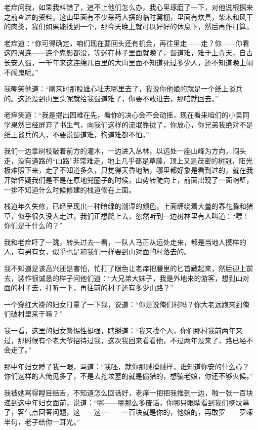 老痒问我，如果我料错了，追不上他们怎么办，我心里琢磨了一下，对他说根据来之前查过的资料，这山里面有不少采药人搭的临时窝棚，里面有炊具，柴木和风干的肉类，我们如果能找到一个，那今天晚上就可以好好的休息下，然后再作打算。

老痒道：“你可得确定，咱们现在要回头还有机会，再往里走——走？你——你看这四周连——连个鬼影都没，等迷在林子里面就晚了，蜀道难，难于上青天，自古长安入蜀，一千年来这连绵几百里的大山里面不知道死过多少人，还不知道晚上闹不闹鬼呢。”

我嘲笑他道：“刚来时那股雄心壮志哪里去了，我说你他娘的就是一个纸上谈兵的。这还没到山里头呢就给我蜀道难了，你要不敢进去，那咱就回去。”

老痒笑道：“我是提出困难在先，看你的决心会不会动摇，现在看来咱们的小吴同学果然已经屏弃了书生气，向我们这样的流氓靠拢了，你放心，你兄弟我绝对不是纸上谈兵的人，不要说蜀道难，狗道难都不怕。”

我们一边拿树枝敲着前方的灌木，一边进入丛林，以远处一座山峰为方向，闷头走，没有道路的“山路”非常难走，地上几乎都是草藤，顶上又是茂密的树冠，阳光极难照下来，走了不知道多久，只觉得天昏地暗，哪里都好象是看到过的，就在我开始怀疑我们是不是在原地兜圈子的时候，山势转陡向上，前面出现了一面峭壁，一排不知道什么时候修建的栈道修在上面。

栈道年久失修，已经呈现出一种暗绿的潮湿的颜色，上面缠绕着大量的春花腾和猪草，似乎很久没人走过，我们正想爬上去，忽然听到一边树林里有人叫道：“喂！你们是干什么的？”

我和老痒吓了一跳，转头过去一看，一队人马正从远处走来，都是当地人摸样的人，有男有女，似乎也是和我们一样要到山对面的村落去的。

我不知道是该高兴还是害怕，忙打了眼色让老痒把腰里的匕首藏起来，然后迎上前去，装作很诚恳的样子问他们道：“大兄弟大妹子，我是外地来的游客，想到山对面的村子去，打听一下，再往前的村子还有多少山路？”

一个穿红大褂的妇女打量了一下我，说道：“你是说俺们村吗？你大老远跑来到俺们破村里来干嘛？”

我一看，这里的妇女警惕性挺强，瞎掰道：“我来找个人，你们那村我前两年来过，那时候有个老大爷招待过我，这次我回来看看他，不过两年没来了，路已经不会走了。”

那中年妇女瞪了我一眼，骂道：“我呸，就你那贼摸贼样，谁知道你安的什么心？你们这样的人俺见多了，不是去挖坟墓的就是偷猎的，想骗老娘，你还不够火候。”

我被她骂得瞠目结舌，不知道怎么回话好，老痒一把把我推到一边，啪一张一百块递到这中年妇女面前，说道：“哪——哪那么多废话，你哪只眼睛看到我们挖坟墓了，客气点回答问题，这——这一——一百块就是你的，他娘的，再敢罗——罗嗦半句，老子给你一耳光。”

